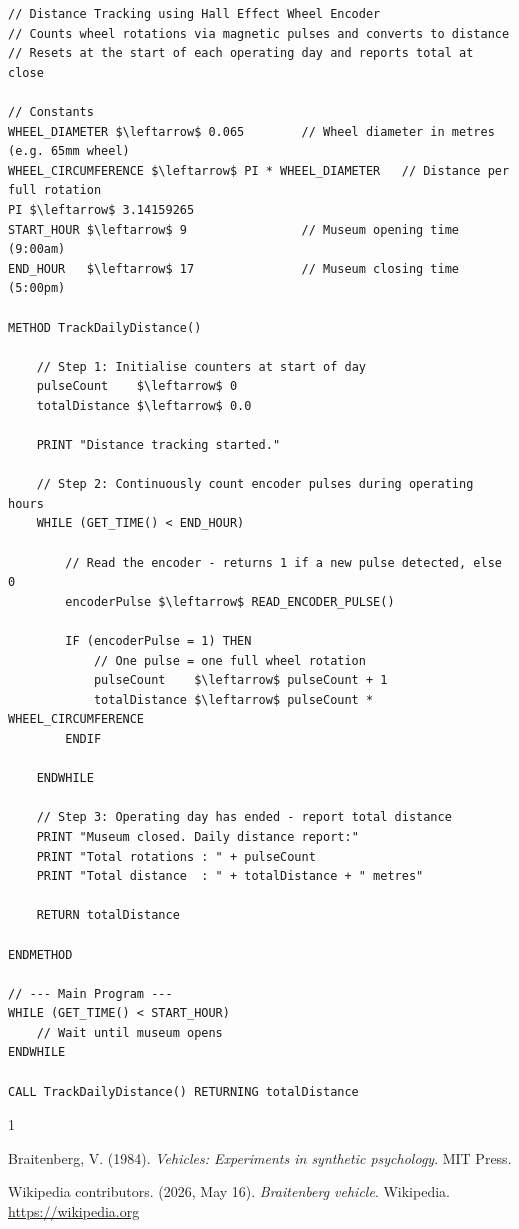 \documentclass[11 pt , a 4 paper ]{article}
\theoremstyle{definition}
\begin{document}
\begin{lstlisting}[mathescape=true]
// Distance Tracking using Hall Effect Wheel Encoder
// Counts wheel rotations via magnetic pulses and converts to distance
// Resets at the start of each operating day and reports total at close

// Constants
WHEEL_DIAMETER $\leftarrow$ 0.065        // Wheel diameter in metres (e.g. 65mm wheel)
WHEEL_CIRCUMFERENCE $\leftarrow$ PI * WHEEL_DIAMETER   // Distance per full rotation
PI $\leftarrow$ 3.14159265
START_HOUR $\leftarrow$ 9                // Museum opening time (9:00am)
END_HOUR   $\leftarrow$ 17               // Museum closing time (5:00pm)

METHOD TrackDailyDistance()

    // Step 1: Initialise counters at start of day
    pulseCount    $\leftarrow$ 0
    totalDistance $\leftarrow$ 0.0

    PRINT "Distance tracking started."

    // Step 2: Continuously count encoder pulses during operating hours
    WHILE (GET_TIME() < END_HOUR)

        // Read the encoder - returns 1 if a new pulse detected, else 0
        encoderPulse $\leftarrow$ READ_ENCODER_PULSE()

        IF (encoderPulse = 1) THEN
            // One pulse = one full wheel rotation
            pulseCount    $\leftarrow$ pulseCount + 1
            totalDistance $\leftarrow$ pulseCount * WHEEL_CIRCUMFERENCE
        ENDIF

    ENDWHILE

    // Step 3: Operating day has ended - report total distance
    PRINT "Museum closed. Daily distance report:"
    PRINT "Total rotations : " + pulseCount
    PRINT "Total distance  : " + totalDistance + " metres"

    RETURN totalDistance

ENDMETHOD

// --- Main Program ---
WHILE (GET_TIME() < START_HOUR)
    // Wait until museum opens
ENDWHILE

CALL TrackDailyDistance() RETURNING totalDistance
\end{lstlisting}

\begin{thebibliography}{1}

Braitenberg, V. (1984). \textit{Vehicles: Experiments in synthetic psychology}. MIT Press.

Wikipedia contributors. (2026, May 16). \textit{Braitenberg vehicle}. Wikipedia. \url{https://wikipedia.org}
\end{thebibliography}
\end{document}
